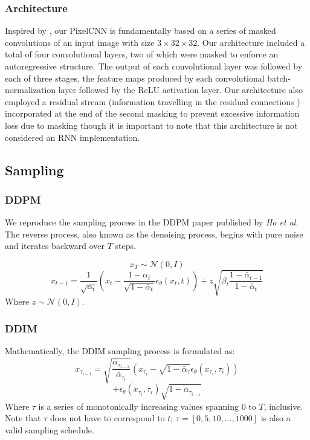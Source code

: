 \documentclass[10pt,twocolumn,letterpaper]{article}
\begin{document}
\subsubsection{Architecture}
Inspired by \cite{PixelCNN, pixelrnn}, our PixelCNN is fundamentally based on a series of masked convolutions of an input image with size $3 \times 32 \times 32$. Our architecture included a total of four convolutional layers, two of which were masked to enforce an autoregressive structure. The output of each convolutional layer was followed by each of three stages, the feature maps produced by each convolutional batch-normalization layer \cite{DBLP:journals/corr/IoffeS15} followed by the ReLU activation layer. Our architecture also employed a residual stream \cite{elhage2021mathematical} (information travelling in the residual connections \cite{DBLP:journals/corr/HeZRS15}) incorporated at the end of the second masking  to prevent excessive information loss due to masking \cite{turukin_pixelcnn} though it is important to note that this architecture is not considered an RNN implementation. 

\subsection{Sampling}
\label{subsec:sampling}
\subsubsection{DDPM}\label{sec: DDPM_Sampling}
We reproduce the sampling process in the DDPM paper published by \textit{Ho et al}\cite{DDPM}. The reverse process, also known as the denoising process, begins with pure noise and iterates backward over $T$ steps.

$$x_T \sim \mathcal{N}(0, I)$$
$$x_{t-1} = \frac{1}{\sqrt{\alpha_t}} \left(x_t - \frac{1 - \alpha_t}{\sqrt{1 - \bar{\alpha}_t}} \epsilon_\theta(x_t, t)\right) + z \sqrt{\beta_t \frac{1 - \bar{\alpha}_{t-1}}{1 - \bar{\alpha}_t}}$$
Where $z \sim \mathcal{N}(0, I)$. 

\subsubsection{DDIM} \label{sec: DDIM_Sampling}
Mathematically, the DDIM sampling process is formulated as\cite{DDIM}:
$$x_{\tau_{i-1}} = \sqrt{\frac{\bar{\alpha}_{\tau_{i-1}}}{\bar{\alpha}_{\tau_i}}} \left(x_{\tau_i} - \sqrt{1 - \bar{\alpha}_\tau} \epsilon_\theta(x_{\tau_i}, \tau_i)\right)$$
$$+ \epsilon_\theta(x_{\tau_i}, \tau_i) \sqrt{1 - \bar{\alpha}_{\tau_{i-1}}}$$
Where $\tau$ is a series of monotonically increasing values spanning $0$ to $T$, inclusive. Note that $\tau$ does not have to correspond to $t$; $\tau = [0, 5, 10, ..., 1000]$ is also a valid sampling schedule.
\end{document}
